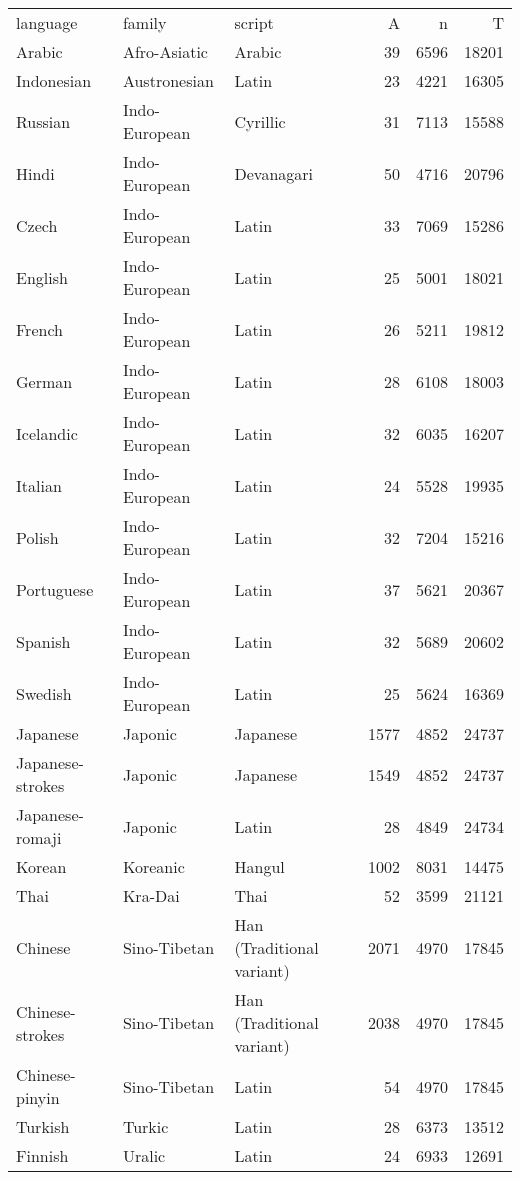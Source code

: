 \begin{table}[ht]
\centering
\begin{tabular}{lllrrr}
 language & family & script & A & n & T \\ 
 Arabic & Afro-Asiatic & Arabic &  39 & 6596 & 18201 \\ 
  Indonesian & Austronesian & Latin &  23 & 4221 & 16305 \\ 
  Russian & Indo-European & Cyrillic &  31 & 7113 & 15588 \\ 
  Hindi & Indo-European & Devanagari &  50 & 4716 & 20796 \\ 
  Czech & Indo-European & Latin &  33 & 7069 & 15286 \\ 
  English & Indo-European & Latin &  25 & 5001 & 18021 \\ 
  French & Indo-European & Latin &  26 & 5211 & 19812 \\ 
  German & Indo-European & Latin &  28 & 6108 & 18003 \\ 
  Icelandic & Indo-European & Latin &  32 & 6035 & 16207 \\ 
  Italian & Indo-European & Latin &  24 & 5528 & 19935 \\ 
  Polish & Indo-European & Latin &  32 & 7204 & 15216 \\ 
  Portuguese & Indo-European & Latin &  37 & 5621 & 20367 \\ 
  Spanish & Indo-European & Latin &  32 & 5689 & 20602 \\ 
  Swedish & Indo-European & Latin &  25 & 5624 & 16369 \\ 
  Japanese & Japonic & Japanese & 1577 & 4852 & 24737 \\ 
  Japanese-strokes & Japonic & Japanese & 1549 & 4852 & 24737 \\ 
  Japanese-romaji & Japonic & Latin &  28 & 4849 & 24734 \\ 
  Korean & Koreanic & Hangul & 1002 & 8031 & 14475 \\ 
  Thai & Kra-Dai & Thai &  52 & 3599 & 21121 \\ 
  Chinese & Sino-Tibetan & Han (Traditional variant) & 2071 & 4970 & 17845 \\ 
  Chinese-strokes & Sino-Tibetan & Han (Traditional variant) & 2038 & 4970 & 17845 \\ 
  Chinese-pinyin & Sino-Tibetan & Latin &  54 & 4970 & 17845 \\ 
  Turkish & Turkic & Latin &  28 & 6373 & 13512 \\ 
  Finnish & Uralic & Latin &  24 & 6933 & 12691 \\ 
   \hline
\end{tabular}
\end{table}
